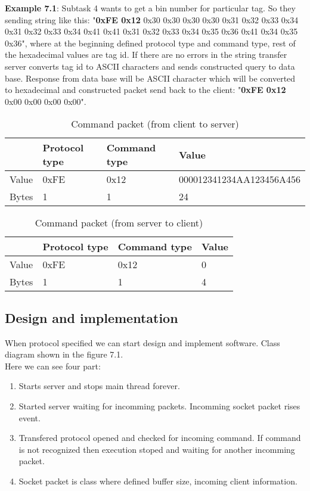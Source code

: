 \textbf{Example 7.1}: Subtask 4 wants to get a bin number for particular tag. So they sending string like this: 
"\textbf{0xFE 0x12} 0x30 0x30 0x30 0x30 0x31 0x32 0x33 0x34 0x31 0x32 0x33 0x34 0x41 0x41 0x31 0x32 0x33 0x34 0x35 0x36 0x41 0x34 0x35 0x36", where at the beginning defined protocol type and command type, rest of the hexadecimal values are tag id. If there are no errors in the string transfer server converts tag id to ASCII characters and sends constructed query to data base. Response from data base will be ASCII character which will be converted to hexadecimal and constructed packet send back to the client: "\textbf{0xFE 0x12} 0x00 0x00 0x00 0x00".

\begin{table}[h]
	\centering
    \begin{tabular}{ | p{1cm} | p{3cm} | p{3cm} | p{5cm} |}
    \hline
	& \textbf{Protocol type} & \textbf{Command type} & \textbf{Value}  \\ \hline
	Value & 0xFE & 0x12 & 000012341234AA123456A456 \\ \hline
	Bytes & 1 & 1 & 24  \\ \hline
    \end{tabular}
	\caption{Command packet (from client to server)}
	\label{tab:AdDis}
\end{table}

\begin{table}[h]
	\centering
    \begin{tabular}{ | p{1cm} | p{3cm} | p{3cm} | p{5cm} |}
    \hline
	& \textbf{Protocol type} & \textbf{Command type} & \textbf{Value}  \\ \hline
	Value & 0xFE & 0x12 & 0 \\ \hline
	Bytes & 1 & 1 & 4  \\ \hline
    \end{tabular}
	\caption{Command packet (from server to client)}
	\label{tab:AdDis}
\end{table}

\subsection{Design and implementation}

When protocol specified we can start design and implement software. Class diagram shown in the figure 7.1. \\ Here we can see four part:

\begin{enumerate}
	\item Starts server and stops main thread forever.
	\item Started server waiting for incomming packets. Incomming socket packet rises event.
	\item Transfered protocol opened and checked for incoming command. If command is not recognized then execution stoped and waiting for another incomming packet.
	\item Socket packet is class where defined buffer size, incoming client information.
\end{enumerate}

